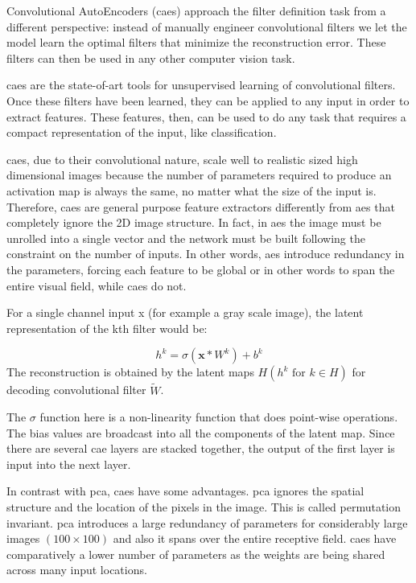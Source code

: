 \documentclass[a4paper,12pt]{report}
\begin{document}
\begin{itemize}
Convolutional AutoEncoders (\gls{cae}s) approach the filter definition task from a different perspective: instead of manually engineer convolutional filters we let the model learn the optimal filters that minimize the reconstruction error. These filters can then be used in any other computer vision task.

\gls{cae}s are the state-of-art tools for unsupervised learning of convolutional filters. Once these filters have been learned, they can be applied to any input in order to extract features. These features, then, can be used to do any task that requires a compact representation of the input, like classification.


\gls{cae}s, due to their convolutional nature, scale well to realistic sized high dimensional images because the number of parameters required to produce an activation map is always the same, no matter what the size of the input is. Therefore, \gls{cae}s are general purpose feature extractors differently from \gls{ae}s that completely ignore the 2D image structure. In fact, in \gls{ae}s the image must be unrolled into a single vector and the network must be built following the constraint on the number of inputs. In other words, \gls{ae}s introduce redundancy in the parameters, forcing each feature to be global or in other words to span the entire visual field, while \gls{cae}s do not.

For a single channel input x (for example a gray scale image), the latent representation of the kth filter would be:

\begin{equation}
    h ^ { k } = \sigma \left( \mathbf { x } * W ^ { k } \right) + b ^ { k }
\end{equation}
The reconstruction is obtained by the latent maps $H (h^k \text{ for } k \in H)$ for decoding convolutional filter $\tilde{W}$.

The $\sigma$ function here is a non-linearity function that does point-wise operations. The bias values are broadcast into all the components of the latent map.  Since there are several \gls{cae} layers are stacked together, the output of the first layer is input into the next layer. 

In contrast with \gls{pca}, \gls{cae}s have some advantages. \gls{pca} ignores the spatial structure and the location of the pixels in the image. This is called permutation invariant. \gls{pca} introduces a large redundancy of parameters for considerably large images $(100\times100)$ and also it spans over the entire receptive field. \gls{cae}s have comparatively a lower number of parameters as the weights are being shared across many input locations.


\end{itemize}
\end{document}
